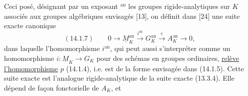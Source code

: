 Ceci posé, désignant par un exposant $^{\mathrm{an}}$ les groupes rigide-analytiques
sur $K$ associés aux groupes algébriques envisagés [13],
on définit dans [24] une suite exacte canonique
\[
(14.1.7)\qquad0\longrightarrow\underline M_K^{\mathrm{an}}
\xrightarrow{i^{\mathrm{an}}}G_K^{\mathrm{an}}\xrightarrow{e}A_K^{\mathrm{an}}\longrightarrow0,
\]
dans laquelle l'homomorphisme $i^{\mathrm{an}}$, qui peut aussi s'interpréter comme
un homomorphisme $i:\underline M_K\longrightarrow G_K$ pour des schémas en groupes ordinaires,
\uline{relève l'homomorphisme} $p$ (14.1.4), i.e. est de la forme envisagée dans
(14.1.5). Cette suite exacte est l'analogue rigide-analytique de la
suite exacte (13.3.4). Elle dépend de façon fonctorielle de $A_K$, et
